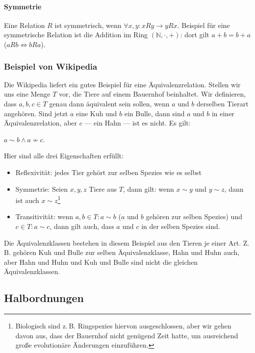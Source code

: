 \documentclass{scrartcl}
\begin{document}
\paragraph{Symmetrie} Eine Relation $R$ ist symmetrisch, wenn $\forall x, y: xRy \longrightarrow yRx$. Beispiel für eine symmetrische Relation ist die Addition im
Ring $(\mathbb{N}, \cdot, +)$: dort gilt $a + b = b + a$ ($aRb \Leftrightarrow bRa$).

\subsubsection{Beispiel von Wikipedia}

Die Wikipedia liefert ein gutes Beispiel für eine Äquivalenzrelation.
Stellen wir uns eine Menge $T$ vor, die Tiere auf einem Bauernhof beinhaltet.
Wir definieren, dass $a, b, c \in T$ genau dann äquivalent sein sollen, wenn
$a$ und $b$ derselben Tierart angehören. 
Sind jetzt $a$ eine Kuh und $b$ ein Bulle, dann sind $a$ und $b$ in einer
Äquivalenzrelation, aber $c$ --- ein Hahn --- ist es nicht. Es gilt:

$a \sim b \wedge a \not\sim c$.

Hier sind alle drei Eigenschaften erfüllt:

\begin{itemize}
	\item Reflexivität: jedes Tier gehört zur selben Spezies wie es selbst
	\item Symmetrie: Seien $x, y, z$ Tiere aus $T$, dann gilt: wenn $x \sim y$ und
		$y \sim z$, dann ist auch $x \sim z$\footnote{Biologisch
		sind z.\,B. Ringspezies hiervon ausgeschlossen, aber wir gehen
		davon aus, dass der Bauernhof nicht genügend Zeit hatte, um
		ausreichend große evolutionäre Änderungen einzuführen.}
	\item Transitivität: wenn $a, b \in T: a \sim b$ ($a$ und $b$ gehören
		zur selben Spezies) und $c \in T: a \sim c$, dann gilt auch,
		dass $a$ und $c$ in der selben Spezies sind.
\end{itemize}

Die Äquivalenzklassen bestehen in diesem Beispiel aus den Tieren je einer Art.
Z.\,B. gehören Kuh und Bulle zur selben Äquivalenzklasse, Hahn und Huhn auch, aber
Hahn und Huhn und Kuh und Bulle sind nicht die gleichen Äquivalenzklassen.

\subsection{Halbordnungen}
\end{document}
